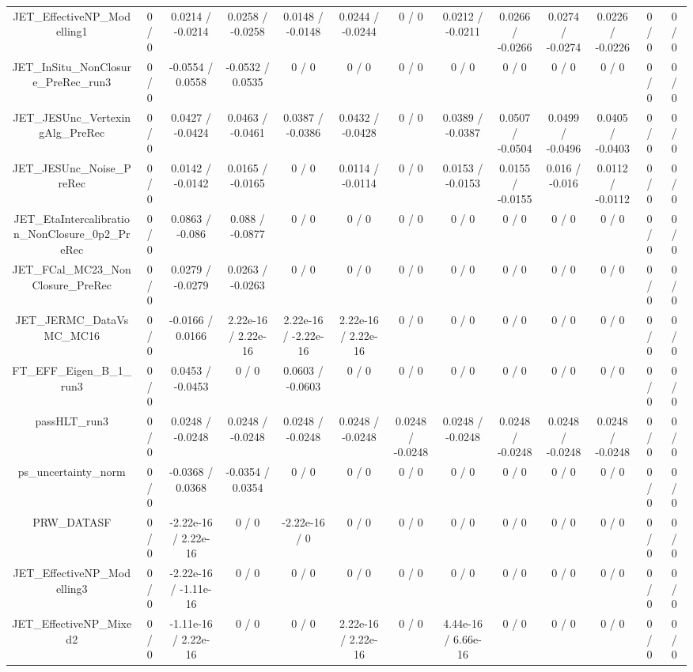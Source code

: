 \documentclass[10pt]{article}
\begin{document}
\begin{table}[htbp]
\begin{center}
\begin{tabular}{|c|c|c|c|c|c|c|c|c|c|c|c|c|}
  JET_EffectiveNP_Modelling1 & 0 / 0 & 0.0214 / -0.0214 & 0.0258 / -0.0258 & 0.0148 / -0.0148 & 0.0244 / -0.0244 & 0 / 0 & 0.0212 / -0.0211 & 0.0266 / -0.0266 & 0.0274 / -0.0274 & 0.0226 / -0.0226 & 0 / 0 & 0 / 0 \\ 
  JET_InSitu_NonClosure_PreRec_run3 & 0 / 0 & -0.0554 / 0.0558 & -0.0532 / 0.0535 & 0 / 0 & 0 / 0 & 0 / 0 & 0 / 0 & 0 / 0 & 0 / 0 & 0 / 0 & 0 / 0 & 0 / 0 \\ 
  JET_JESUnc_VertexingAlg_PreRec & 0 / 0 & 0.0427 / -0.0424 & 0.0463 / -0.0461 & 0.0387 / -0.0386 & 0.0432 / -0.0428 & 0 / 0 & 0.0389 / -0.0387 & 0.0507 / -0.0504 & 0.0499 / -0.0496 & 0.0405 / -0.0403 & 0 / 0 & 0 / 0 \\ 
  JET_JESUnc_Noise_PreRec & 0 / 0 & 0.0142 / -0.0142 & 0.0165 / -0.0165 & 0 / 0 & 0.0114 / -0.0114 & 0 / 0 & 0.0153 / -0.0153 & 0.0155 / -0.0155 & 0.016 / -0.016 & 0.0112 / -0.0112 & 0 / 0 & 0 / 0 \\ 
  JET_EtaIntercalibration_NonClosure_0p2_PreRec & 0 / 0 & 0.0863 / -0.086 & 0.088 / -0.0877 & 0 / 0 & 0 / 0 & 0 / 0 & 0 / 0 & 0 / 0 & 0 / 0 & 0 / 0 & 0 / 0 & 0 / 0 \\ 
  JET_FCal_MC23_NonClosure_PreRec & 0 / 0 & 0.0279 / -0.0279 & 0.0263 / -0.0263 & 0 / 0 & 0 / 0 & 0 / 0 & 0 / 0 & 0 / 0 & 0 / 0 & 0 / 0 & 0 / 0 & 0 / 0 \\ 
  JET_JERMC_DataVsMC_MC16 & 0 / 0 & -0.0166 / 0.0166 & 2.22e-16 / 2.22e-16 & 2.22e-16 / -2.22e-16 & 2.22e-16 / 2.22e-16 & 0 / 0 & 0 / 0 & 0 / 0 & 0 / 0 & 0 / 0 & 0 / 0 & 0 / 0 \\ 
  FT_EFF_Eigen_B_1_run3 & 0 / 0 & 0.0453 / -0.0453 & 0 / 0 & 0.0603 / -0.0603 & 0 / 0 & 0 / 0 & 0 / 0 & 0 / 0 & 0 / 0 & 0 / 0 & 0 / 0 & 0 / 0 \\ 
  passHLT_run3 & 0 / 0 & 0.0248 / -0.0248 & 0.0248 / -0.0248 & 0.0248 / -0.0248 & 0.0248 / -0.0248 & 0.0248 / -0.0248 & 0.0248 / -0.0248 & 0.0248 / -0.0248 & 0.0248 / -0.0248 & 0.0248 / -0.0248 & 0 / 0 & 0 / 0 \\ 
  ps_uncertainty_norm & 0 / 0 & -0.0368 / 0.0368 & -0.0354 / 0.0354 & 0 / 0 & 0 / 0 & 0 / 0 & 0 / 0 & 0 / 0 & 0 / 0 & 0 / 0 & 0 / 0 & 0 / 0 \\ 
  PRW_DATASF & 0 / 0 & -2.22e-16 / 2.22e-16 & 0 / 0 & -2.22e-16 / 0 & 0 / 0 & 0 / 0 & 0 / 0 & 0 / 0 & 0 / 0 & 0 / 0 & 0 / 0 & 0 / 0 \\ 
  JET_EffectiveNP_Modelling3 & 0 / 0 & -2.22e-16 / -1.11e-16 & 0 / 0 & 0 / 0 & 0 / 0 & 0 / 0 & 0 / 0 & 0 / 0 & 0 / 0 & 0 / 0 & 0 / 0 & 0 / 0 \\ 
  JET_EffectiveNP_Mixed2 & 0 / 0 & -1.11e-16 / 2.22e-16 & 0 / 0 & 0 / 0 & 2.22e-16 / 2.22e-16 & 0 / 0 & 4.44e-16 / 6.66e-16 & 0 / 0 & 0 / 0 & 0 / 0 & 0 / 0 & 0 / 0 \\ 

\end{tabular}
\end{center}
\end{table}
\end{document}
